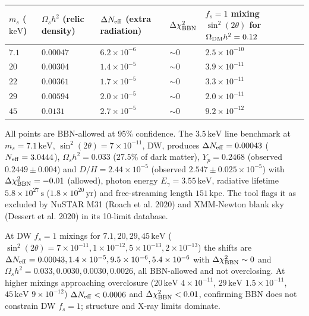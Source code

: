 \documentclass[11pt,a4paper]{article}
\begin{document}
\begin{longtable}{@{}p{}p{}p{}p{}p{}@{}}
\toprule
\textbf{$m_s$ ($\mathrm{keV}$)} & \textbf{$\Omega_s h^2$ (relic density)} & \textbf{$\Delta N_{\rm eff}$ (extra radiation)} & \textbf{$\Delta\chi^2_{\rm BBN}$} & \textbf{$f_s=1$ mixing $\sin^2(2\theta)$ for $\Omega_{\rm DM}h^2 = 0.12$} \\ \midrule \endhead
$7.1$ & $0.00047$ & $6.2\times10^{-6}$ & $\sim 0$ & $2.5\times10^{-10}$ \\
$20$ & $0.00304$ & $1.4\times10^{-5}$ & $\sim 0$ & $3.9\times10^{-11}$ \\
$22$ & $0.00361$ & $1.7\times10^{-5}$ & $\sim 0$ & $3.3\times10^{-11}$ \\
$29$ & $0.00594$ & $2.0\times10^{-5}$ & $\sim 0$ & $2.0\times10^{-11}$ \\
$45$ & $0.0131$ & $2.7\times10^{-5}$ & $\sim 0$ & $9.2\times10^{-12}$ \\
\bottomrule\end{longtable}
All points are BBN-allowed at 95\% confidence. The $3.5\,\mathrm{keV}$ line benchmark at $m_s = 7.1\,\mathrm{keV}$, $\sin^2(2\theta) = 7\times10^{-11}$, DW, produces $\Delta N_{\rm eff} = 0.00043$ ($N_{\rm eff} = 3.0444$), $\Omega_s h^2 = 0.033$ ($27.5\%$ of dark matter), $Y_p = 0.2468$ (observed $0.2449 \pm 0.004$) and $D/H = 2.44\times10^{-5}$ (observed $2.547 \pm 0.025\times10^{-5}$) with $\Delta\chi^2_{\rm BBN} = -0.01$ (allowed), photon energy $E_\gamma = 3.55\,\mathrm{keV}$, radiative lifetime $5.8\times10^{27}\,\mathrm{s}$ ($1.8\times10^{20}\,\mathrm{yr}$) and free-streaming length $151\,\mathrm{kpc}$. The tool flags it as excluded by NuSTAR M31 (Roach et al. 2020) and XMM-Newton blank sky (Dessert et al. 2020) in its 10-limit database.

At DW $f_s=1$ mixings for $7.1, 20, 29, 45\,\mathrm{keV}$ ($\sin^2(2\theta) = 7\times10^{-11}, 1\times10^{-12}, 5\times10^{-13}, 2\times10^{-13}$) the shifts are $\Delta N_{\rm eff} = 0.00043, 1.4\times10^{-5}, 9.5\times10^{-6}, 5.4\times10^{-6}$ with $\Delta\chi^2_{\rm BBN} \sim 0$ and $\Omega_s h^2 = 0.033, 0.0030, 0.0030, 0.0026$, all BBN-allowed and not overclosing. At higher mixings approaching overclosure ($20\,\mathrm{keV}$ $4\times10^{-11}$, $29\,\mathrm{keV}$ $1.5\times10^{-11}$, $45\,\mathrm{keV}$ $9\times10^{-12}$) $\Delta N_{\rm eff} < 0.0006$ and $\Delta\chi^2_{\rm BBN} < 0.01$, confirming BBN does not constrain DW $f_s=1$; structure and X-ray limits dominate.
\end{document}
